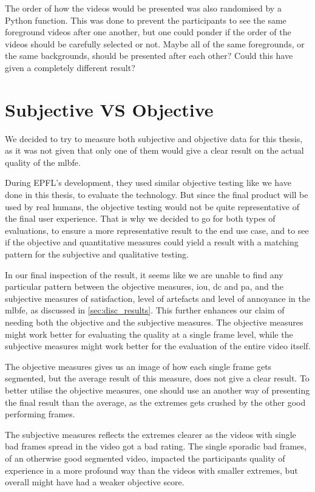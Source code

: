 The order of how the videos would be presented was also randomised by a Python function. This was done to prevent the participants to see the same foreground videos after one another, but one could ponder if the order of the videos should be carefully selected or not. Maybe all of the same foregrounds, or the same backgrounds, should be presented after each other? Could this have given a completely different result?

\section{Subjective VS Objective}\label{sec:disc_qua}

We decided to try to measure both subjective and objective data for this thesis, as it was not given that only one of them would give a clear result on the actual quality of the \acrlong{mlbfe}. 

During EPFL's development, they used similar objective testing like we have done in this thesis, to evaluate the technology. But since the final product will be used by real humans, the objective testing would not be quite representative of the final user experience. That is why we decided to go for both types of evaluations, to ensure a more representative result to the end use case, and to see if the objective and quantitative measures could yield a result with a matching pattern for the subjective and qualitative testing.

In our final inspection of the result, it seems like we are unable to find any particular pattern between the objective measures, \acrshort{iou}, \acrshort{dc} and \acrshort{pa}, and the subjective measures of satisfaction, level of artefacts and level of annoyance in the \acrlong{mlbfe}, as discussed in \autoref{sec:disc_results}. This further enhances our claim of needing both the objective and the subjective measures. The objective measures might work better for evaluating the quality at a single frame level, while the subjective measures might work better for the evaluation of the entire video itself. 

The objective measures gives us an image of how each single frame gets segmented, but the average result of this measure, does not give a clear result. To better utilise the objective measures, one should use an another way of presenting the final result than the average, as the extremes gets crushed by the other good performing frames. 

The subjective measures reflects the extremes clearer as the videos with single bad frames spread in the video got a bad rating. The single sporadic bad frames, of an otherwise good segmented video, impacted the participants quality of experience in a more profound way than the videos with smaller extremes, but overall might have had a weaker objective score. 

